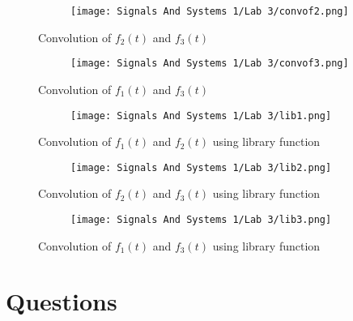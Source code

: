 \documentclass[12pt,a4paper]{article}
\begin{document}
\begin{figure}[h]
\centering
\begin{subfigure}{ 1\textwidth}
\texttt{[image: Signals And Systems 1/Lab 3/convof2.png]}
\end{subfigure}
\caption{ Convolution of $f_2(t)$ and $f_3(t)$}
\label{fig2:image22}
\end{figure}

\begin{figure}[h]
\centering
\begin{subfigure}{ 1\textwidth}
\texttt{[image: Signals And Systems 1/Lab 3/convof3.png]}
\end{subfigure}
\caption{ Convolution of $f_1(t)$ and $f_3(t)$ }
\label{fig2:image22}
\end{figure}

\newpage
\begin{figure}[h]
\centering
\begin{subfigure}{ 1\textwidth}
\texttt{[image: Signals And Systems 1/Lab 3/lib1.png]}
\end{subfigure}
\caption{ Convolution of $f_1(t)$ and $f_2(t)$ using library function}
\label{fig2:image22}
\end{figure}

\begin{figure}[h]
\centering
\begin{subfigure}{ 1\textwidth}
\texttt{[image: Signals And Systems 1/Lab 3/lib2.png]}
\end{subfigure}
\caption{ Convolution of $f_2(t)$ and $f_3(t)$ using library function}
\label{fig2:image22}
\end{figure}


\newpage
\begin{figure}[h]
\centering
\begin{subfigure}{ 1\textwidth}
\texttt{[image: Signals And Systems 1/Lab 3/lib3.png]}
\end{subfigure}
\caption{ Convolution of $f_1(t)$ and $f_3(t)$ using library function}
\label{fig2:image22}
\end{figure}
\newpage
\section{Questions}\label{sec:res}
\end{document}
